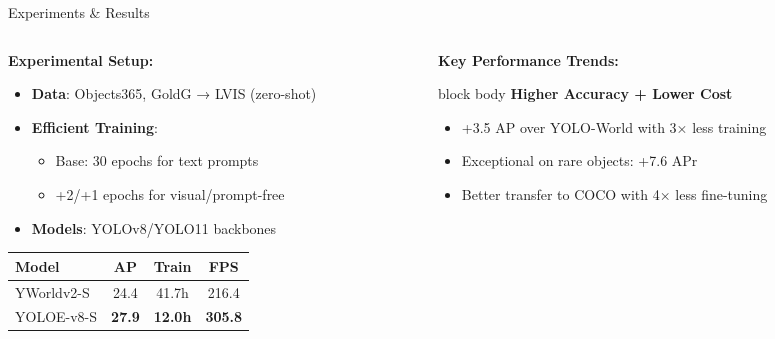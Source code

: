 \documentclass{beamer}
\begin{document}
\begin{frame}{Experiments \& Results}
    \begin{columns}[T]
        \begin{column}{0.45\textwidth}
            \textbf{Experimental Setup:}
            \begin{itemize}\small
                \item \textbf{Data}: Objects365, GoldG → LVIS (zero-shot)
                \item \textbf{Efficient Training}:
                \begin{itemize}\footnotesize
                    \item Base: 30 epochs for text prompts
                    \item +2/+1 epochs for visual/prompt-free
                \end{itemize}
                \item \textbf{Models}: YOLOv8/YOLO11 backbones
            \end{itemize}
            
            \vspace{-0.1cm}
            \begin{center}
            \scriptsize
            \begin{tabular}{|l|c|c|c|}
            \hline
            \textbf{Model} & \textbf{AP} & \textbf{Train} & \textbf{FPS} \\
            \hline
            YWorldv2-S & 24.4 & 41.7h & 216.4 \\
            \rowcolor{gray!15} YOLOE-v8-S & \textbf{27.9} & \textbf{12.0h} & \textbf{305.8} \\
            \hline
            \end{tabular}
            \end{center}
        \end{column}
        
        \begin{column}{0.52\textwidth}
            \textbf{Key Performance Trends:}
            \vspace{0.1cm}
            
            \begin{beamercolorbox}[rounded=true,shadow=true,wd=\textwidth]{block body}
                \centering\textbf{Higher Accuracy + Lower Cost}\vspace{-0.1cm}
                \begin{itemize}\small\setlength{\itemsep}{0pt}
                    \item \textcolor{ubburgundy}{+3.5 AP} over YOLO-World with \textcolor{ubburgundy}{3×} less training
                    \item Exceptional on rare objects: \textcolor{ubburgundy}{+7.6 APr}
                    \item Better transfer to COCO with \textcolor{ubburgundy}{4×} less fine-tuning
                \end{itemize}
            \end{beamercolorbox}
            

\end{column}
\end{columns}
\end{frame}
\end{document}
